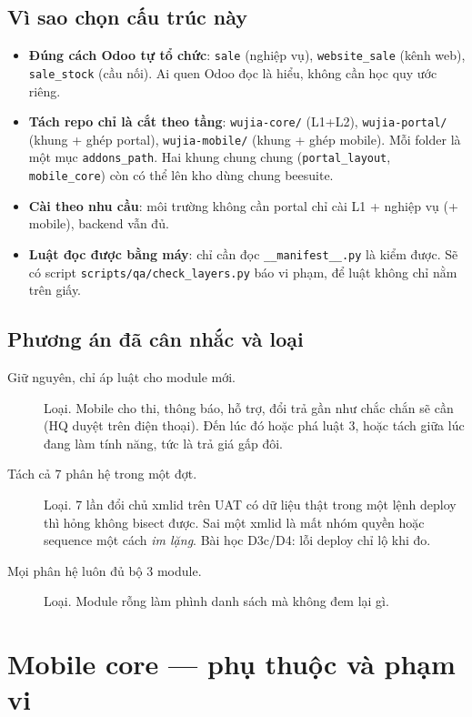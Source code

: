 \subsection{Vì sao chọn cấu trúc này}

\begin{itemize}
\item \textbf{Đúng cách Odoo tự tổ chức}: \texttt{sale} (nghiệp vụ), \texttt{website\_sale}
  (kênh web), \texttt{sale\_stock} (cầu nối). Ai quen Odoo đọc là hiểu, không cần học quy ước riêng.
\item \textbf{Tách repo chỉ là cắt theo tầng}: \texttt{wujia-core/} (L1+L2),
  \texttt{wujia-portal/} (khung + ghép portal), \texttt{wujia-mobile/} (khung + ghép mobile). Mỗi folder là
  một mục \texttt{addons\_path}. Hai khung chung chung (\texttt{portal\_layout},
  \texttt{mobile\_core}) còn có thể lên kho dùng chung beesuite.
\item \textbf{Cài theo nhu cầu}: môi trường không cần portal chỉ cài L1 + nghiệp vụ (+ mobile), backend
  vẫn đủ.
\item \textbf{Luật đọc được bằng máy}: chỉ cần đọc \texttt{\_\_manifest\_\_.py} là kiểm được. Sẽ
  có script \texttt{scripts/qa/check\_layers.py} báo vi phạm, để luật không chỉ nằm trên giấy.
\end{itemize}

\subsection{Phương án đã cân nhắc và loại}

\begin{description}
\item[Giữ nguyên, chỉ áp luật cho module mới.] Loại. Mobile cho thi, thông báo, hỗ trợ, đổi trả
  gần như chắc chắn sẽ cần (HQ duyệt trên điện thoại). Đến lúc đó hoặc phá luật 3, hoặc tách giữa
  lúc đang làm tính năng, tức là trả giá gấp đôi.
\item[Tách cả 7 phân hệ trong một đợt.] Loại. 7 lần đổi chủ xmlid trên UAT có dữ liệu thật trong
  một lệnh deploy thì hỏng không bisect được. Sai một xmlid là mất nhóm quyền hoặc sequence một
  cách \emph{im lặng}. Bài học D3c/D4: lỗi deploy chỉ lộ khi đo.
\item[Mọi phân hệ luôn đủ bộ 3 module.] Loại. Module rỗng làm phình danh sách mà không đem lại gì.
\end{description}

\section{Mobile core --- phụ thuộc và phạm vi}


